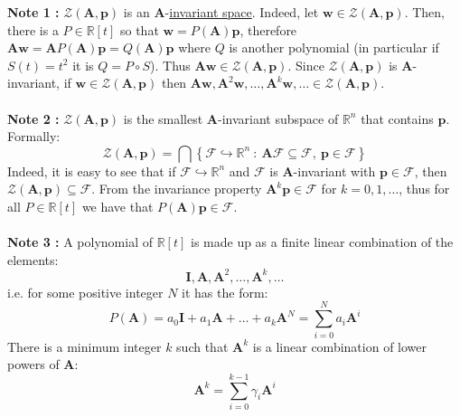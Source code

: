 \documentclass[a4paper,10pt,oneside]{book}
\begin{document}
\noindent \textbf{Note 1 :} $\mathcal{Z}(\mathbf{A},\mathbf{p})$ is an $\mathbf{A}$-\hyperlink{def:invariantSubspace}{invariant space}. Indeed, let $\mathbf{w}\in\mathcal{Z}(\mathbf{A},\mathbf{p})$. Then, there is a $P\in\mathbb{R}[t]$ so that $\mathbf{w}=P(\mathbf{A})\mathbf{p}$, therefore $\mathbf{Aw}=\mathbf{A}P(\mathbf{A})\mathbf{p}=Q(\mathbf{A})\mathbf{p}$ where $Q$ is another polynomial (in particular if $S(t)=t^2$ it is $Q=P\circ S$). Thus $\mathbf{Aw}\in\mathcal{Z}(\mathbf{A},\mathbf{p})$. Since $\mathcal{Z}(\mathbf{A},\mathbf{p})$ is $\mathbf{A}$-invariant, if $\mathbf{w}\in\mathcal{Z}(\mathbf{A},\mathbf{p})$ then $\mathbf{Aw},\mathbf{A}^2\mathbf{w},\ldots,\mathbf{A}^k\mathbf{w},\ldots\in\mathcal{Z}(\mathbf{A},\mathbf{p})$.\\
\\
\noindent \textbf{Note 2 :} $\mathcal{Z}(\mathbf{A},\mathbf{p})$ is the smallest $\mathbf{A}$-invariant subspace of $\mathbb{R}^n$ that contains $\mathbf{p}$. Formally:
\begin{equation}
 \mathcal{Z}(\mathbf{A},\mathbf{p}) = \bigcap \left\{ \mathcal{F}\hookrightarrow \mathbb{R}^n \ :\ \mathbf{A}\mathcal{F}\subseteq \mathcal{F},\ \mathbf{p}\in\mathcal{F}\right\}
\end{equation}
Indeed, it is easy to see that if $\mathcal{F}\hookrightarrow \mathbb{R}^n$ and $\mathcal{F}$ is $\mathbf{A}$-invariant with $\mathbf{p}\in\mathcal{F}$, then $\mathcal{Z}(\mathbf{A},\mathbf{p})\subseteq\mathcal{F}$. From the invariance property $\mathbf{A}^k\mathbf{p}\in\mathcal{F}$ for $k=0,1,\ldots$, thus for all $P\in\mathbb{R}[t]$ we have that $P(\mathbf{A})\mathbf{p}\in\mathcal{F}$.\\
\\
\noindent \textbf{Note 3 :} A polynomial of $\mathbb{R}[t]$ is made up as a finite linear combination of the elements:
\begin{equation}
 \mathbf{I},\mathbf{A},\mathbf{A}^2,\ldots,\mathbf{A}^k,\ldots
\end{equation}
i.e. for some positive integer $N$ it has the form:
\begin{equation}
 P(\mathbf{A})=a_0\mathbf{I}+a_1\mathbf{A}+\ldots+a_k\mathbf{A}^N=\sum_{i=0}^{N}a_i\mathbf{A}^i
\end{equation}
There is a minimum integer $k$ such that $\mathbf{A}^k$ is a linear combination of lower powers of $\mathbf{A}$:
\begin{equation}\label{eqn:Akspan}
 \mathbf{A}^k=\sum_{i=0}^{k-1} \gamma_i \mathbf{A}^i
\end{equation}
\end{document}

